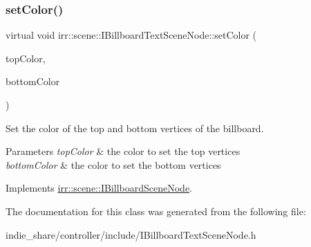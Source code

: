\subsubsection{\texorpdfstring{set\+Color()}{setColor()}\hspace{0.1cm}{\footnotesize\ttfamily [2/2]}}
{\footnotesize\ttfamily virtual void irr\+::scene\+::\+I\+Billboard\+Text\+Scene\+Node\+::set\+Color (\begin{DoxyParamCaption}\item[{const \hyperlink{classirr_1_1video_1_1SColor}{video\+::\+S\+Color} \&}]{top\+Color,  }\item[{const \hyperlink{classirr_1_1video_1_1SColor}{video\+::\+S\+Color} \&}]{bottom\+Color }\end{DoxyParamCaption})\hspace{0.3cm}{\ttfamily [pure virtual]}}



Set the color of the top and bottom vertices of the billboard. 


\begin{DoxyParams}{Parameters}
{\em top\+Color} & the color to set the top vertices \\
\hline
{\em bottom\+Color} & the color to set the bottom vertices \\
\hline
\end{DoxyParams}


Implements \hyperlink{classirr_1_1scene_1_1IBillboardSceneNode_a13efdfa73998706baf10cedcdb48d559}{irr\+::scene\+::\+I\+Billboard\+Scene\+Node}.



The documentation for this class was generated from the following file\+:\begin{DoxyCompactItemize}
\item 
indie\+\_\+share/controller/include/I\+Billboard\+Text\+Scene\+Node.\+h\end{DoxyCompactItemize}
